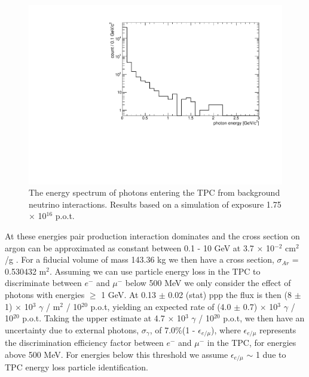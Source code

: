 \begin{figure}[htbp]
\begin{center}
  	\includegraphics[width=120mm]{Chapter4/figures/photon_energies_in_TPC.pdf}
	\caption{The energy spectrum of photons entering the TPC from background neutrino interactions. Results based on a simulation of exposure 1.75 $\times$ 10$^{16}$ p.o.t. }
	\label{fig:gammaEnergySpectrumInTPC}
\end{center}
\end{figure}
At these energies pair production interaction dominates and the cross section on argon can be approximated as constant between 0.1 - 10 GeV at 3.7 $\times$ 10$^{-2}$ cm$^{2}$/g \cite{nistDatabase}. For a fiducial volume of mass 143.36 kg we then have a cross section, $\sigma_{Ar}$ = 0.530432 m$^{2}$. Assuming we can use particle energy loss in the TPC to discriminate between $e^{-}$ and $\mu^{-}$ below 500 MeV we only consider the effect of photons with energies $\geq$ 1 GeV. At 0.13 $\pm$ 0.02 (stat) ppp the flux is then (8 $\pm$ 1) $\times$ 10$^{3}$ $\gamma$ / m$^{2}$ / 10$^{20}$ p.o.t, yielding an expected rate of (4.0 $\pm$ 0.7) $\times$ 10$^{3}$ $\gamma$ / 10$^{20}$ p.o.t. Taking the upper estimate at 4.7 $\times$ 10$^{3}$ $\gamma$ / 10$^{20}$ p.o.t, we then have an uncertainty due to external photons, $\sigma_{\gamma}$, of 7.0\%(1 - $\epsilon_{e/\mu}$), where $\epsilon_{e/\mu}$ represents the discrimination efficiency factor between $e^{-}$ and $\mu^{-}$ in the TPC, for energies above 500 MeV. For energies below this threshold we assume $\epsilon_{e/\mu}$ $\sim$ 1 due to TPC energy loss particle identification.


